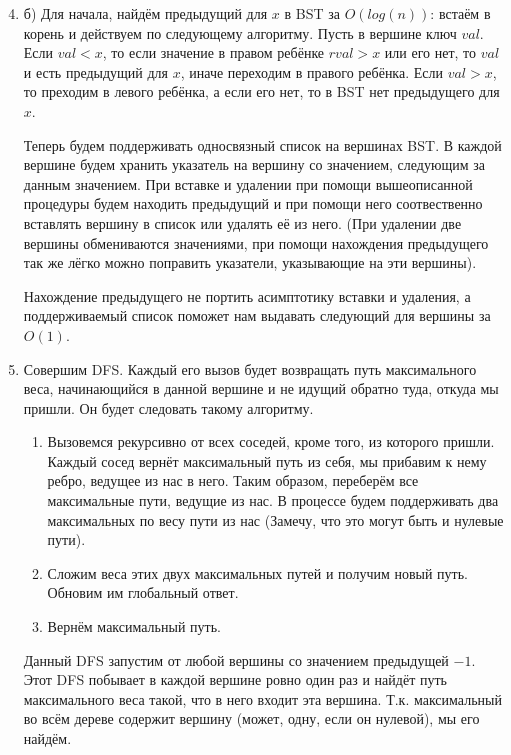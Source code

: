 \documentclass[a4paper,12pt]{article}
\begin{document}
\lstset{language=python}

\begin{enumerate}

\setcounter{enumi}{3}
\item б) Для начала, найдём предыдущий для $x$ в BST за $O(log(n))$: встаём в корень и действуем по следующему алгоритму. Пусть в вершине ключ $val$. Если $val < x$, то если значение в правом ребёнке $rval > x$ или его нет, то $val$ и есть предыдущий для $x$, иначе переходим в правого ребёнка. Если $val > x$, то преходим в левого ребёнка, а если его нет, то в BST нет предыдущего для $x$.

Теперь будем поддерживать односвязный список на вершинах BST. В каждой вершине будем хранить указатель на вершину со значением, следующим за данным значением. При вставке и удалении при помощи вышеописанной процедуры будем находить предыдущий и при помощи него соотвественно вставлять вершину в список или удалять её из него. (При удалении две вершины обмениваются значениями, при помощи нахождения предыдущего так же лёгко можно поправить указатели, указывающие на эти вершины).

Нахождение предыдущего не портить асимптотику вставки и удаления, а поддерживаемый список поможет нам выдавать следующий для вершины за $O(1)$.

\item Совершим DFS. Каждый его вызов будет возвращать путь максимального веса, начинающийся в данной вершине и не идущий обратно туда, откуда мы пришли. Он будет следовать такому алгоритму.
\begin{enumerate}
\item Вызовемся рекурсивно от всех соседей, кроме того, из которого пришли. Каждый сосед вернёт максимальный путь из себя, мы прибавим к нему ребро, ведущее из нас в него. Таким образом, переберём все максимальные пути, ведущие из нас. В процессе будем поддерживать два максимальных по весу пути из нас (Замечу, что это могут быть и нулевые пути). 
\item Сложим веса этих двух максимальных путей и получим новый путь. Обновим им глобальный ответ.
\item Вернём максимальный путь.
\end{enumerate}

Данный DFS запустим от любой вершины со значением предыдущей $-1$. Этот DFS побывает в каждой вершине ровно один раз и найдёт путь максимального веса такой, что в него входит эта вершина. Т.к. максимальный во всём дереве содержит вершину (может, одну, если он нулевой), мы его найдём.


\end{enumerate}
\end{document}
